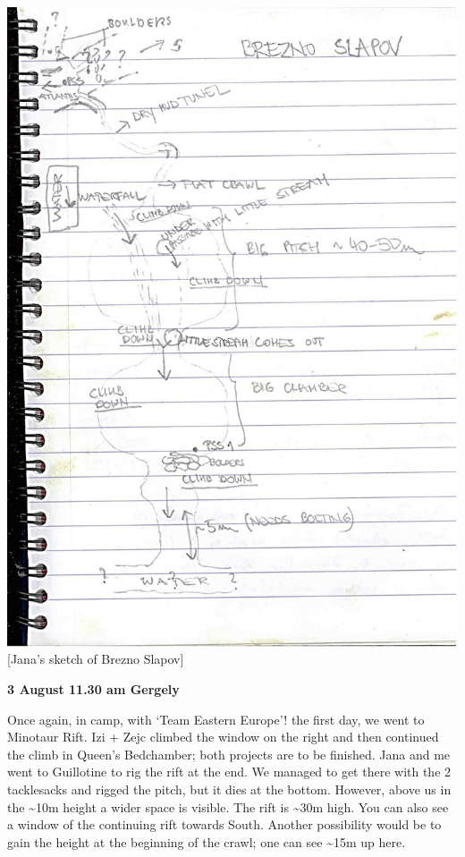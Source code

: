 \includegraphics{UgLog1012/84.jpeg}\\
{[}Jana's sketch of Brezno Slapov{]}

\textbf{3 August 11.30 am Gergely}

Once again, in camp, with `Team Eastern Europe'! the first day, we went
to Minotaur Rift. Izi + Zejc climbed the window on the right and then
continued the climb in Queen's Bedchamber; both projects are to be
finished. Jana and me went to Guillotine to rig the rift at the end. We
managed to get there with the 2 tacklesacks and rigged the pitch, but it
dies at the bottom. However, above us in the \textasciitilde{}10m height
a wider space is visible. The rift is \textasciitilde{}30m high. You can
also see a window of the continuing rift towards South. Another
possibility would be to gain the height at the beginning of the crawl;
one can see \textasciitilde{}15m up here.

